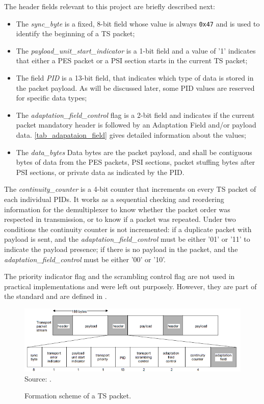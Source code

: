\documentclass[
	12pt,				%
	openright,			%
	twoside,			%
	a4paper,			%
	brazil,
	french,				%
	english
	]{abntex2}
\begin{document}
The header fields relevant to this project are briefly described next:
\begin{itemize}
\item{The \textit{sync\_byte} is a fixed, 8-bit field whose value is always \texttt{0x47} and is used to identify the beginning of a TS packet;}
\item{ The \textit{payload\_unit\_start\_indicator} is a 1-bit field and a value of '1' indicates that either a PES packet or a PSI section starts in the current TS packet;}
\item{The field \textit{PID} is a 13-bit field, that indicates which type of data is stored in the packet payload. As will be discussed later, some PID values are reserved for specific data types;}
\item{The \textit{adaptation\_field\_control} flag is a 2-bit field and indicates if the current packet mandatory header is followed by an Adaptation Field and/or payload data. \autoref{tab_adapataion_field} gives detailed information about the values;}
\item{The \textit{data\_bytes} Data bytes are the packet payload, and shall be contiguous bytes of data from the PES packets, PSI sections, packet stuffing bytes after PSI sections, or private data as indicated by the PID.}
 \end{itemize}

The \textit{continuity\_counter} is a 4-bit counter that increments on every TS packet of each individual PIDs. It works as a sequential checking and reordering information for the demultiplexer to know whether the packet order was respected in transmission, or to know if a packet was repeated. Under two conditions the continuity counter is not incremented: if a duplicate packet with payload is sent, and the \textit{adaptation\_field\_control} must be either '01' or '11' to indicate the payload presence; if there is no payload in the packet, and the \textit{adaptation\_field\_control} must be either '00' or '10'.
 
The priority indicator flag and the scrambling control flag are not used in practical implementations and were left out purposely. However, they are part of the standard and are defined in .
 
\begin{figure}
\centering
\caption{Formation scheme of a TS packet.}
\includegraphics[width=1\linewidth]{figuras/TS_iso13818.png}
\\Source: .
\label{fig:TS_iso13818}
\end{figure}
\end{document}
